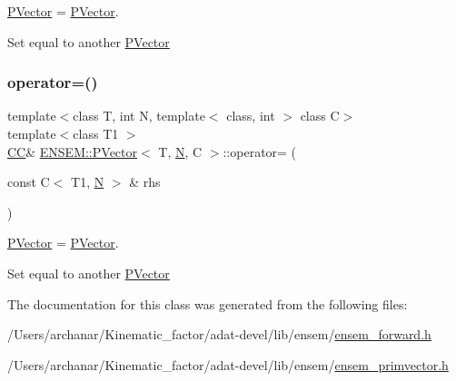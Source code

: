 \mbox{\hyperlink{classENSEM_1_1PVector}{P\+Vector}} = \mbox{\hyperlink{classENSEM_1_1PVector}{P\+Vector}}. 

Set equal to another \mbox{\hyperlink{classENSEM_1_1PVector}{P\+Vector}} \mbox{\label{classENSEM_1_1PVector_a2917b5cc8ed23d68b4cc6f1cfb0f9172}} 
\subsubsection{\texorpdfstring{operator=()}{operator=()}\hspace{0.1cm}{\footnotesize\ttfamily [3/3]}}
{\footnotesize\ttfamily template$<$class T, int N, template$<$ class, int $>$ class C$>$ \\
template$<$class T1 $>$ \\
\mbox{\hyperlink{classENSEM_1_1PVector_a92dc0a0a301a3dc96f7be5d337019bc7}{CC}}\& \mbox{\hyperlink{classENSEM_1_1PVector}{E\+N\+S\+E\+M\+::\+P\+Vector}}$<$ T, \mbox{\hyperlink{adat__devel_2lib_2hadron_2operator__name__util_8cc_a7722c8ecbb62d99aee7ce68b1752f337}{N}}, C $>$\+::operator= (\begin{DoxyParamCaption}\item[{const C$<$ T1, \mbox{\hyperlink{adat__devel_2lib_2hadron_2operator__name__util_8cc_a7722c8ecbb62d99aee7ce68b1752f337}{N}} $>$ \&}]{rhs }\end{DoxyParamCaption})\hspace{0.3cm}{\ttfamily [inline]}}



\mbox{\hyperlink{classENSEM_1_1PVector}{P\+Vector}} = \mbox{\hyperlink{classENSEM_1_1PVector}{P\+Vector}}. 

Set equal to another \mbox{\hyperlink{classENSEM_1_1PVector}{P\+Vector}} 

The documentation for this class was generated from the following files\+:\begin{DoxyCompactItemize}
\item 
/\+Users/archanar/\+Kinematic\+\_\+factor/adat-\/devel/lib/ensem/\mbox{\hyperlink{adat-devel_2lib_2ensem_2ensem__forward_8h}{ensem\+\_\+forward.\+h}}\item 
/\+Users/archanar/\+Kinematic\+\_\+factor/adat-\/devel/lib/ensem/\mbox{\hyperlink{adat-devel_2lib_2ensem_2ensem__primvector_8h}{ensem\+\_\+primvector.\+h}}\end{DoxyCompactItemize}
